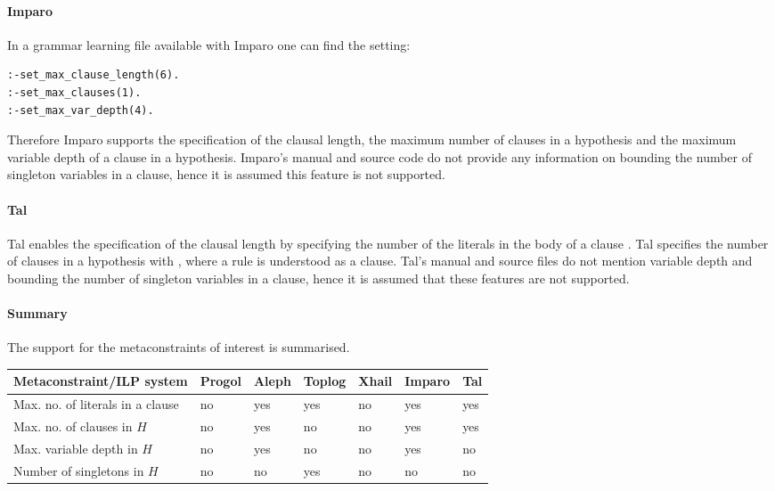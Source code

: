 \paragraph{Imparo}
In a grammar learning file available with Imparo\cite{kimber2013imparo} one can find the setting:
\begin{lstlisting}
:-set_max_clause_length(6).
:-set_max_clauses(1).
:-set_max_var_depth(4).
\end{lstlisting}
Therefore Imparo supports the specification of the clausal length, the maximum number of clauses in a hypothesis and the maximum variable depth of a clause in a hypothesis. Imparo's manual and source code do not provide any information on bounding the number of singleton variables in a clause, hence it is assumed this feature is not supported.

\paragraph{Tal}
Tal enables the specification of the clausal length by specifying the number of the literals in the body of a clause \cite{corapi2010inductive}. Tal specifies the number of clauses in a hypothesis with \cite{corapi2010inductive}, where a rule is understood as a clause. Tal's manual and source files do not mention variable depth and bounding the number of singleton variables in a clause, hence it is assumed that these features are not supported.

\paragraph{Summary}
The support for the metaconstraints of interest is summarised.

 \label{tab:classification_by_metaconstraints} 
 \begin{tabular}{| l | l | l | l | l | l | l |}
    \hline
    Metaconstraint/ILP system & Progol & Aleph & Toplog & Xhail & Imparo & Tal \\ \hline
    Max. no. of literals in a clause & no & yes & yes & no & yes & yes\\ \hline
    Max. no. of clauses in $H$ & no & yes & no & no & yes & yes\\ \hline
    Max. variable depth in $H$ & no & yes & no & no & yes & no\\ \hline
    Number of singletons in $H$ & no & no & yes & no & no & no\\ \hline
  \end{tabular}
  
